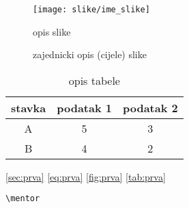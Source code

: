 

\begin{figure}[!htbp]
	\begin{center}
 \texttt{[image: slike/ime\_slike]}
 \caption{opis slike}
 \label{fig:ID_slike}
	\end{center}
\end{figure}


\begin{figure}[!htpb]
	  \begin{center}
\caption{zajednicki opis (cijele) slike}
\label{fig:ID_slike}
	  \end{center}
\end{figure}


\begin{table}[!htbp]
\caption{opis tabele}
\centering
\begin{tabular}{|c|c|c|}
stavka & podatak 1 & podatak 2 \\ [0.5ex]
\hline \hline
A & 5 & 3 \\ [0.5ex]
B & 4 & 2 \\ [0.5ex]
\end{tabular}
\label{tab:ID_tabele}
\end{table}


\cite{joler:2010}	%

\ref{sec:prva}  %
\ref{eq:prva}		%
\ref{fig:prva}	%
\ref{tab:prva}	%

\pageref{oznaka}	%


\verb|\mentor|

